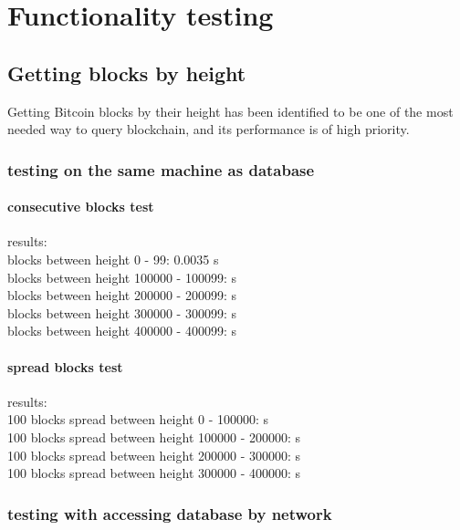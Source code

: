 \documentclass[12pt, en, eng, oneside]{mgr}
\begin{document}
\chapter{Functionality testing}

\section{Getting blocks by height}
Getting Bitcoin blocks by their height has been identified to be one of the most needed way to query blockchain, and its performance is of high priority.
 
\subsection{testing on the same machine as database} 

\subsubsection{consecutive blocks test}
results:
\\
blocks between height 0 - 99: \quad \quad \quad \hspace*{2em} 0.0035 s\\
blocks between height 100000 - 100099:  s\\
blocks between height 200000 - 200099:  s\\
blocks between height 300000 - 300099:  s\\
blocks between height 400000 - 400099:  s\\

\subsubsection{spread blocks test}
results:
\\
100 blocks spread between height 0 - 100000: \quad \quad {} s\\
100 blocks spread between height 100000 - 200000:  s\\
100 blocks spread between height 200000 - 300000:  s\\
100 blocks spread between height 300000 - 400000:  s\\

\subsection{testing with accessing database by network}
\end{document}
